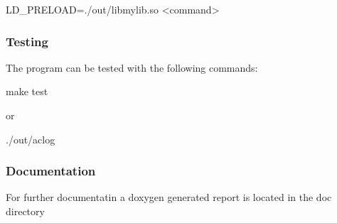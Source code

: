 \begin{DoxyCode}
LD\_PRELOAD=./out/libmylib.so <command>
\end{DoxyCode}


\subsubsection*{Testing}

The program can be tested with the following commands\+:


\begin{DoxyCode}
make test
\end{DoxyCode}


or 
\begin{DoxyCode}
./out/aclog
\end{DoxyCode}


\subsubsection*{Documentation}

For further documentatin a doxygen generated report is located in the doc directory 